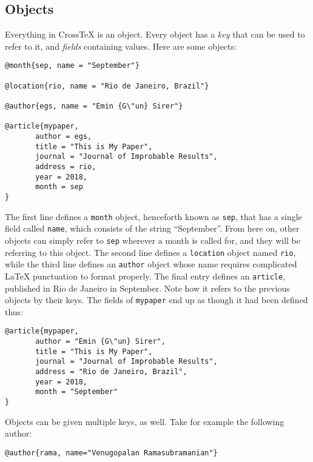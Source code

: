 \documentclass{article}
\newcommand{\XTX}{Cross\TeX}
\begin{document}
\subsection{Objects}

Everything in \XTX{} is an object. Every object has a \textit{key} that
can be used to refer to it, and \textit{fields} containing values. Here
are some objects:

\begin{small}\begin{verbatim}
@month{sep, name = "September"}

@location{rio, name = "Rio de Janeiro, Brazil"}

@author{egs, name = "Emin {G\"un} Sirer"}

@article{mypaper,
	   author = egs,
	   title = "This is My Paper",
	   journal = "Journal of Improbable Results",
	   address = rio,
	   year = 2018,
	   month = sep
}
\end{verbatim}\end{small}

The first line defines a \texttt{month} object, henceforth known as
\texttt{sep}, that has a single field called \texttt{name}, which consists
of the string ``September''. From here on, other objects can simply refer
to \texttt{sep} wherever a month is called for, and they will be referring
to this object. The second line defines a \texttt{location} object named
\texttt{rio}, while the third line defines an \texttt{author} object whose
name requires complicated \LaTeX{} punctuation to format properly. The
final entry defines an \texttt{article}, published in Rio de Janeiro in
September. Note how it refers to the previous objects by their keys. The
fields of \texttt{mypaper} end up as though it had been defined thus:

\begin{small}\begin{verbatim}
@article{mypaper,
	   author = "Emin {G\"un} Sirer",
	   title = "This is My Paper",
	   journal = "Journal of Improbable Results",
	   address = "Rio de Janeiro, Brazil",
	   year = 2018,
	   month = "September"
}
\end{verbatim}\end{small}

Objects can be given multiple keys, as well. Take for example the
following author:

\begin{small}\begin{verbatim}
@author{rama, name="Venugopalan Ramasubramanian"}
\end{verbatim}\end{small}
\end{document}
